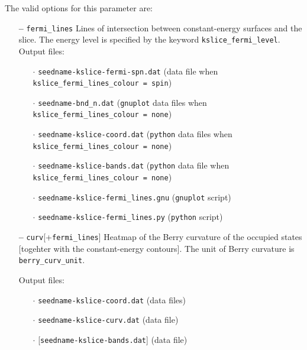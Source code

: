The valid options for this parameter are:
\begin{itemize}

\item[{\bf --}] \verb#fermi_lines# Lines of intersection between
  constant-energy surfaces and the slice. The energy level is
  specified by the keyword {\tt kslice\_fermi\_level}. Output files:

  \begin{itemize}

  \item[$\cdot$] {\tt seedname-kslice-fermi-spn.dat} (data file when
    {\tt kslice\_fermi\_lines\_colour = spin})

  \item[$\cdot$] {\tt seedname-bnd\_n.dat} ({\tt gnuplot} data files
    when {\tt kslice\_fermi\_lines\_colour = none})

  \item[$\cdot$] {\tt seedname-kslice-coord.dat} ({\tt python} data
    files when {\tt kslice\_fermi\_lines\_colour = none})

  \item[$\cdot$] {\tt seedname-kslice-bands.dat} ({\tt python} data
    file when {\tt kslice\_fermi\_lines\_colour = none})

  \item[$\cdot$] {\tt seedname-kslice-fermi\_lines.gnu} ({\tt gnuplot}
    script)

  \item[$\cdot$] {\tt seedname-kslice-fermi\_lines.py} ({\tt python}
    script)

  \end{itemize}

\item[{\bf --}] \verb#curv#[+\verb#fermi_lines#] Heatmap of the Berry
  curvature of the occupied states [togehter with the constant-energy
  contours]. The unit of Berry curvature is {\tt berry\_curv\_unit}.

Output files:

  \begin{itemize}

  \item[$\cdot$] {\tt seedname-kslice-coord.dat} (data files)
    
  \item[$\cdot$] {\tt seedname-kslice-curv.dat} (data file)

  \item[$\cdot$] [{\tt seedname-kslice-bands.dat}] (data file)
    

\end{itemize}
\end{itemize}
